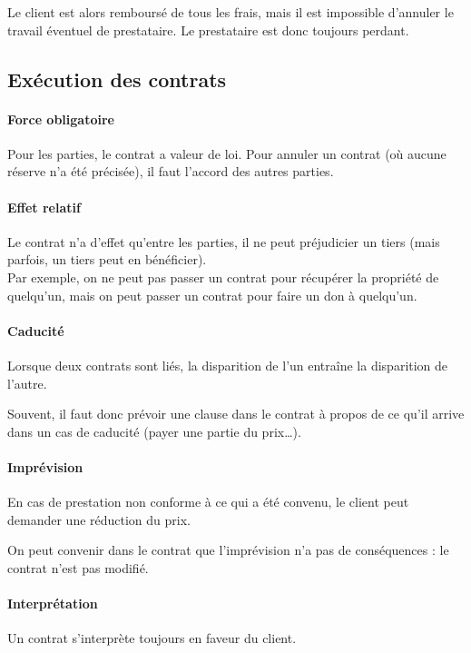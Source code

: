 \documentclass[10pt,a4paper,french]{article}
\begin{document}
Le client est alors remboursé de tous les frais, mais il est impossible d'annuler le travail éventuel de prestataire. Le prestataire est donc toujours perdant.

\subsection{Exécution des contrats}

\paragraph{Force obligatoire}
Pour les parties, le contrat a valeur de loi. Pour annuler un contrat (où aucune réserve n'a été précisée), il faut l'accord des autres parties.

\paragraph{Effet relatif}
Le contrat n'a d'effet qu'entre les parties, il ne peut préjudicier un tiers (mais parfois, un tiers peut en bénéficier). \\
Par exemple, on ne peut pas passer un contrat pour récupérer la propriété de quelqu'un, mais on peut passer un contrat pour faire un don à quelqu'un.

\paragraph{Caducité}
Lorsque deux contrats sont liés, la disparition de l'un entraîne la disparition de l'autre.

Souvent, il faut donc prévoir une clause dans le contrat à propos de ce qu'il arrive dans un cas de caducité (payer une partie du prix\ldots).

\paragraph{Imprévision}
En cas de prestation non conforme à ce qui a été convenu, le client peut demander une réduction du prix.

On peut convenir dans le contrat que l'imprévision n'a pas de conséquences : le contrat n'est pas modifié.

\paragraph{Interprétation}
Un contrat s'interprète toujours en faveur du client.
\end{document}
